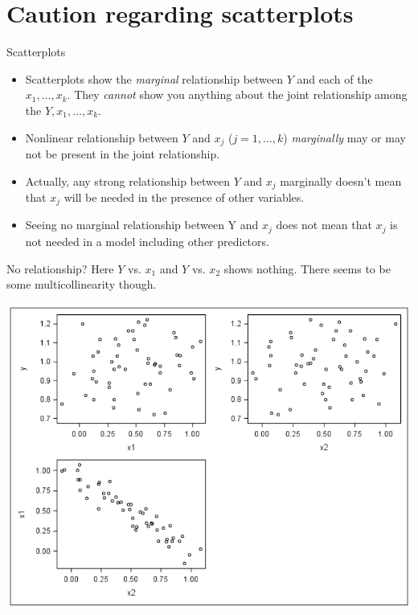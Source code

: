 \documentclass{beamer}
\begin{document}
\section{Caution regarding scatterplots}

\begin{frame}{Scatterplots}
\begin{itemize}
\item Scatterplots show the \textit{marginal} relationship between $Y$ and
each of the $x_1, \ldots, x_k$. \pause They \textit{cannot} show you anything about the joint relationship among the $Y, x_1, \ldots, x_k$.
\item \pause Nonlinear relationship between $Y$ and $x_j$ ($j = 1, \ldots, k$) \textit{marginally} may or may not be present in the joint relationship.
\item \pause Actually, any strong relationship between $Y$ and $x_j$ marginally
doesn't mean that $x_j$ will be needed in the presence of other
variables.
\item \pause Seeing no marginal relationship between Y and $x_j$ does not
mean that $x_j$ is not needed in a model including other
predictors.
\end{itemize}
\end{frame}

\begin{frame}{No relationship?}
Here $Y$ vs. $x_1$ and $Y$ vs. $x_2$ shows nothing. There seems to be some multicollinearity though.
\vspace{10pt}

\centerline{\includegraphics[scale=0.3]{plots/scat}}
\end{frame}
\end{document}
